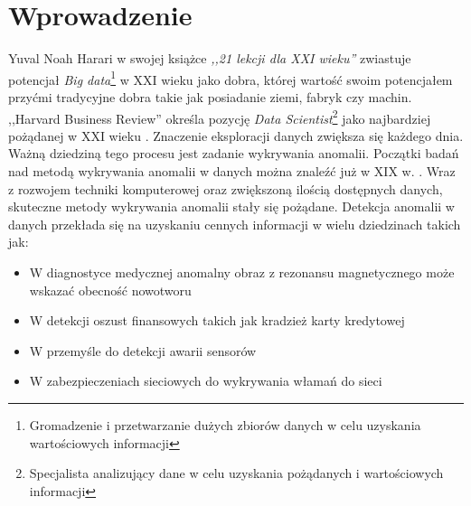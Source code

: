 \section{Wprowadzenie}
\label{sec:wprowadzenie}

Yuval Noah Harari w swojej książce \textit{,,21 lekcji dla XXI wieku''} zwiastuje potencjał \textit{Big data}\footnote{Gromadzenie i przetwarzanie dużych zbiorów danych w celu uzyskania wartościowych informacji} w XXI wieku jako dobra, której wartość swoim potencjałem przyćmi tradycyjne dobra takie jak posiadanie ziemi, fabryk czy machin.
,,Harvard Business Review'' określa pozycję \textit{Data Scientist}\footnote{Specjalista analizujący dane w celu uzyskania pożądanych i wartościowych informacji} jako najbardziej pożądanej w XXI wieku \cite{davenport2012data}. Znaczenie eksploracji danych zwiększa się każdego dnia.
Ważną dziedziną tego procesu jest zadanie wykrywania anomalii. Początki badań nad metodą wykrywania anomalii w danych można znaleźć już w XIX w. \cite{edgeworth1887xli}. 
Wraz z rozwojem techniki komputerowej oraz zwiększoną ilością dostępnych danych, skuteczne metody wykrywania anomalii stały się pożądane. 
Detekcja anomalii w danych przekłada się na uzyskaniu cennych informacji w wielu dziedzinach takich jak:
\begin{itemize}
    \item W diagnostyce medycznej anomalny obraz z rezonansu magnetycznego może wskazać obecność nowotworu \cite{spence2001detection}
    \item W detekcji oszust finansowych takich jak kradzież karty kredytowej \cite{bolton2001unsupervised}
    \item W przemyśle do detekcji awarii sensorów \cite{dereszynski2011spatiotemporal} 
    \item W zabezpieczeniach sieciowych do wykrywania włamań do sieci \cite{garcia2009anomaly}
\end{itemize} 

